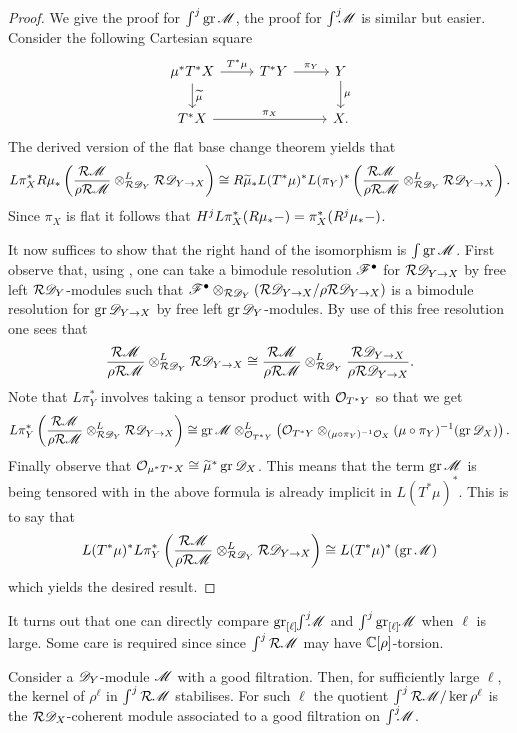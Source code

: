 \begin{proof}
  We give the proof for $\int^j \operatorname{gr} \mathscr{M}$, the proof for $\int^j \mkern -8mu \mathscr{M}$ is similar but easier.
  Consider the following Cartesian square
  $$
      \begin{tikzcd}
        \mu^*T^* X \arrow{r}{T^*\mu} \arrow{d}{{\widetilde{\mu}}} &T^*Y \arrow{r}{\pi_Y} & Y\arrow{d}{\mu} \\
        T^*X\arrow{rr}{\pi_X}  && X.
      \end{tikzcd}
  $$
  The derived version of the flat base change theorem \cite[Chapter 4, Proposition 3.1.0]{berthelot2006theorie}  yields that
  $$L\pi_X^*R\mu_*\left(\frac{\mathcal{R}\mathscr{M}}{\rho\mathcal{R} \mathscr{M}}\otimes^L_{\mathcal{R}\mathscr{D}_Y}\mathcal{R} \mathscr{D}_{Y\to X}\right)\cong  R\widetilde{\mu}_*L(T^*\mu)^*L(\pi_Y)^*\left(\frac{\mathcal{R}\mathscr{M}}{\rho\mathcal{R} \mathscr{M}}\otimes^L_{\mathcal{R}\mathscr{D}_Y}\mathcal{R} \mathscr{D}_{Y\to X}\right).$$
  Since $\pi_X$ is flat it follows that $H^j L\pi_X^*(R\mu_* {-}) = \pi_X^*(R^j\mu_*{-})$.

  It now suffices to show that the right hand of the isomorphism is $\int \operatorname{gr}\mathscr{M}$.
  First observe that, using , one can take a bimodule resolution $\mathscr{F}^\bullet$ for $\mathcal{R} \mathscr{D}_{Y\to X}$ by free left $\mathcal{R}\mathscr{D}_Y$-modules such that $\mathscr{F}^\bullet \otimes_{\mathcal{R} \mathscr{D}_Y}(\mathcal{R} \mathscr{D}_{Y\to X} / \rho\mathcal{R} \mathscr{D}_{Y\to X})$ is a bimodule resolution for $\operatorname{gr} \mathscr{D}_{Y\to X}$ by free left $\operatorname{gr}\mathscr{D}_Y$-modules.
  By use of this free resolution one sees that
  $$ \frac{\mathcal{R}\mathscr{M}}{\rho\mathcal{R} \mathscr{M}}\otimes^L_{\mathcal{R}\mathscr{D}_Y}\mathcal{R} \mathscr{D}_{Y\to X} \cong \frac{\mathcal{R}\mathscr{M}}{\rho\mathcal{R} \mathscr{M}} \otimes^L_{\mathcal{R}\mathscr{D}_Y}\frac{\mathcal{R} \mathscr{D}_{Y\to X}}{\rho\mathcal{R} \mathscr{D}_{Y\to X}}.$$
  Note that $L\pi_Y^*$ involves taking a tensor product with $\mathcal{O}_{T^*Y}$ so that we get
  $$L\pi_Y^*\left( \frac{\mathcal{R}\mathscr{M}}{\rho\mathcal{R} \mathscr{M}}\otimes^L_{\mathcal{R}\mathscr{D}_Y} \mathcal{R} \mathscr{D}_{Y\to X}\right) \cong \operatorname{gr}\mathscr{M} \otimes_{\mathcal{O}_{T^*Y}}^L \left( \mathcal{O}_{T^*Y}\otimes_{(\mu\circ \pi_Y)^{-1}\mathcal{O}_X}(\mu\circ\pi_Y)^{-1}(\operatorname{gr}\mathscr{D}_X)\right).$$
  Finally observe that $\mathcal{O}_{\mu^*T^*X} \cong \widetilde{\mu}^*\operatorname{gr}\mathscr{D}_X$.
  This means that the term $\operatorname{gr}\mathscr{M}$ is being tensored with in the above formula is already implicit in $L(T^*\mu)^*$.
  This is to say that
  $$L(T^*\mu)^*L\pi_Y^*\left( \frac{\mathcal{R}\mathscr{M}}{\rho\mathcal{R} \mathscr{M}}\otimes^L_{\mathcal{R}\mathscr{D}_Y} \mathcal{R} \mathscr{D}_{Y\to X}\right) \cong L(T^*\mu)^*\left(\operatorname{gr}\mathscr{M}\right)$$
  which yields the desired result.
\end{proof}
It turns out that one can directly compare $\operatorname{gr}_{[\ell]}\mkern-5mu\int^j \mkern -8mu\mathscr{M}$ and $\int^j \operatorname{gr}_{[\ell]}\mkern-5mu\mathscr{M}$ when $\ell$ is large.
Some care is required since since $\int^j \mathcal{R} \mathscr{M}$ may have $\mathbb{C}[\rho]$-torsion.
\begin{lemma}\label{lem: KernelZellStabilises}
  Consider a $\mathscr{D}_Y$-module $\mathscr{M}$ with a good filtration.
  Then, for sufficiently large $\ell$, the kernel of $\rho^\ell$ in $\int^j \mathcal{R} \mathscr{M}$ stabilises.
  For such $\ell$ the quotient $\int^j \mathcal{R} \mathscr{M}/ \ker \rho^\ell$ is the $\mathcal{R} \mathscr{D}_X$-coherent module associated to a good filtration on $\int^j \mkern -8mu \mathscr{M}$.
\end{lemma}
